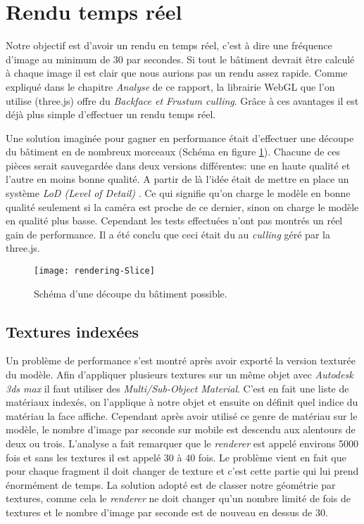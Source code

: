 \section{Rendu temps réel}

Notre objectif est d'avoir un rendu en temps réel, c'est à dire une fréquence d'image au minimum de 30 par secondes. Si tout le bâtiment devrait être calculé à chaque image il est clair que nous aurions pas un rendu assez rapide. Comme expliqué dans le chapitre \emph{Analyse} de ce rapport, la librairie WebGL que l'on utilise (three.js) offre du \textit{Backface et Frustum culling}. Grâce à ces avantages il est déjà plus simple d'effectuer un rendu temps réel.

Une solution imaginée pour gagner en performance était d'effectuer une découpe du bâtiment en de nombreux morceaux (Schéma en figure \ref{fig:rendering-slice}). Chacune de ces pièces serait sauvegardée dans deux versions différentes: une en haute qualité et l'autre en moins bonne qualité. A partir de là l'idée était de mettre en place un système \emph{LoD (Level of Detail)} \cite{wiki-lod}. Ce qui signifie qu'on charge le modèle en bonne qualité seulement si la caméra est proche de ce dernier, sinon on charge le modèle en qualité plus basse. Cependant les tests effectuées n'ont pas montrés un réel gain de performance. Il a été conclu que ceci était du au \textit{culling} géré par la three.js.

\begin{figure}
\centering
\texttt{[image: rendering-Slice]}
\caption{Schéma d'une découpe du bâtiment possible.}
\label{fig:rendering-slice}
\end{figure}

\subsection{Textures indexées}
Un problème de performance s'est montré après avoir exporté la version texturée du modèle. Afin d'appliquer plusieurs textures sur un même objet avec \textit{Autodesk 3ds max} il faut utiliser des \emph{Multi/Sub-Object Material}. C'est en fait une liste de matériaux indexés, on l'applique à notre objet et ensuite on définit quel indice du matériau la face affiche. Cependant après avoir utilisé ce genre de matériau sur le modèle, le nombre d'image par seconde sur mobile est descendu aux alentours de deux ou trois. L'analyse a fait remarquer que le \textit{renderer} est appelé environs 5000 fois et sans les textures il est appelé 30 à 40 fois. Le problème vient en fait que pour chaque fragment il doit changer de texture et c'est cette partie qui lui prend énormément de temps. La solution adopté est de classer notre géométrie par textures, comme cela le \textit{renderer} ne doit changer qu'un nombre limité de fois de textures et le nombre d'image par seconde est de nouveau en dessus de 30.

